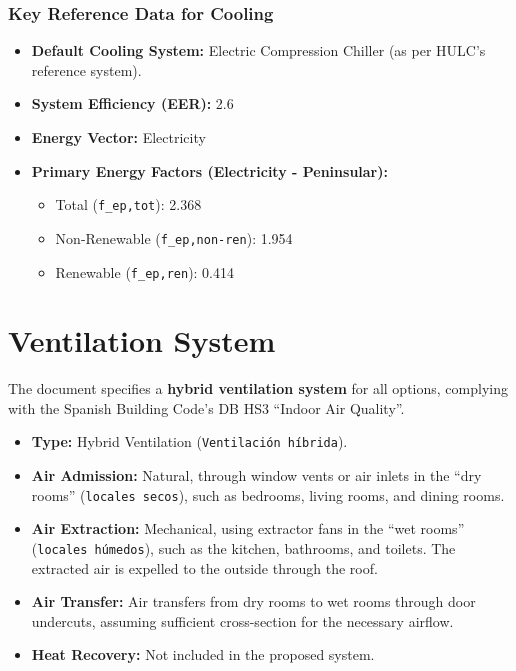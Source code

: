 \documentclass[
  10pt,
  letterpaper,
]{scrbook}
\providecommand{\tightlist}{%
  \setlength{\itemsep}{0pt}\setlength{\parskip}{0pt}}
\begin{document}
\subsection{Key Reference Data for
Cooling}\label{key-reference-data-for-cooling}

\begin{itemize}
\tightlist
\item
  \textbf{Default Cooling System:} Electric Compression Chiller (as per
  HULC's reference system).
\item
  \textbf{System Efficiency (EER):} 2.6
\item
  \textbf{Energy Vector:} Electricity
\item
  \textbf{Primary Energy Factors (Electricity - Peninsular):}

  \begin{itemize}
  \tightlist
  \item
    Total (\texttt{f\_ep,tot}): 2.368
  \item
    Non-Renewable (\texttt{f\_ep,non-ren}): 1.954
  \item
    Renewable (\texttt{f\_ep,ren}): 0.414
  \end{itemize}
\end{itemize}


\chapter{Ventilation System}\label{ventilation-system}

The document specifies a \textbf{hybrid ventilation system} for all
options, complying with the Spanish Building Code's DB HS3 ``Indoor Air
Quality''.

\begin{itemize}
\tightlist
\item
  \textbf{Type:} Hybrid Ventilation (\texttt{Ventilación\ híbrida}).
\item
  \textbf{Air Admission:} Natural, through window vents or air inlets in
  the ``dry rooms'' (\texttt{locales\ secos}), such as bedrooms, living
  rooms, and dining rooms.
\item
  \textbf{Air Extraction:} Mechanical, using extractor fans in the ``wet
  rooms'' (\texttt{locales\ húmedos}), such as the kitchen, bathrooms,
  and toilets. The extracted air is expelled to the outside through the
  roof.
\item
  \textbf{Air Transfer:} Air transfers from dry rooms to wet rooms
  through door undercuts, assuming sufficient cross-section for the
  necessary airflow.
\item
  \textbf{Heat Recovery:} Not included in the proposed system.
\end{itemize}
\end{document}
